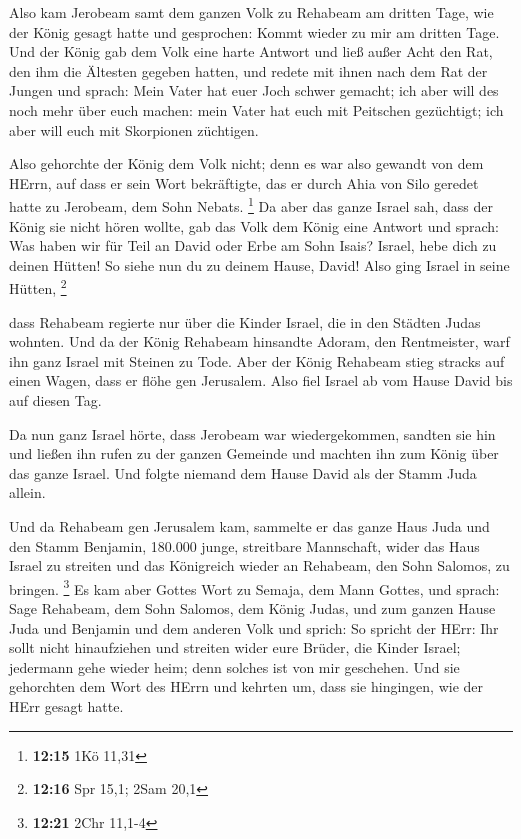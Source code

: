  Also kam Jerobeam samt dem ganzen Volk zu Rehabeam am
dritten Tage, wie der König gesagt hatte und gesprochen: Kommt wieder zu
mir am dritten Tage.  Und der König gab dem Volk eine harte
Antwort und ließ außer Acht den Rat, den ihm die Ältesten gegeben
hatten,  und redete mit ihnen nach dem Rat der Jungen und
sprach: Mein Vater hat euer Joch schwer gemacht; ich aber will des noch
mehr über euch machen: mein Vater hat euch mit Peitschen gezüchtigt; ich
aber will euch mit Skorpionen züchtigen.

 Also gehorchte der König dem Volk nicht; denn es war also
gewandt von dem HErrn, auf dass er sein Wort bekräftigte, das er durch
Ahia von Silo geredet hatte zu Jerobeam, dem Sohn Nebats. \footnote{\textbf{12:15}
  1Kö 11,31}  Da aber das ganze Israel sah, dass der König
sie nicht hören wollte, gab das Volk dem König eine Antwort und sprach:
Was haben wir für Teil an David oder Erbe am Sohn Isais? Israel, hebe
dich zu deinen Hütten! So siehe nun du zu deinem Hause, David! Also ging
Israel in seine Hütten, \footnote{\textbf{12:16} Spr 15,1; 2Sam 20,1}

 dass Rehabeam regierte nur über die Kinder Israel, die in
den Städten Judas wohnten.  Und da der König Rehabeam
hinsandte Adoram, den Rentmeister, warf ihn ganz Israel mit Steinen zu
Tode. Aber der König Rehabeam stieg stracks auf einen Wagen, dass er
flöhe gen Jerusalem.  Also fiel Israel ab vom Hause David
bis auf diesen Tag.

 Da nun ganz Israel hörte, dass Jerobeam war
wiedergekommen, sandten sie hin und ließen ihn rufen zu der ganzen
Gemeinde und machten ihn zum König über das ganze Israel. Und folgte
niemand dem Hause David als der Stamm Juda allein.

 Und da Rehabeam gen Jerusalem kam, sammelte er das ganze
Haus Juda und den Stamm Benjamin, 180.000 junge, streitbare Mannschaft,
wider das Haus Israel zu streiten und das Königreich wieder an Rehabeam,
den Sohn Salomos, zu bringen. \footnote{\textbf{12:21} 2Chr 11,1-4}
 Es kam aber Gottes Wort zu Semaja, dem Mann Gottes, und
sprach:  Sage Rehabeam, dem Sohn Salomos, dem König Judas,
und zum ganzen Hause Juda und Benjamin und dem anderen Volk und sprich:
 So spricht der HErr: Ihr sollt nicht hinaufziehen und
streiten wider eure Brüder, die Kinder Israel; jedermann gehe wieder
heim; denn solches ist von mir geschehen. Und sie gehorchten dem Wort
des HErrn und kehrten um, dass sie hingingen, wie der HErr gesagt hatte.


